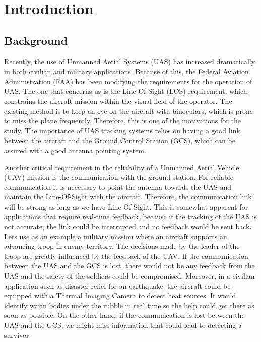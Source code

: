 \chapter{Introduction}
\label{ch:introduction}

\section{Background}
Recently, the use of Unmanned Aerial Systems (UAS) has increased dramatically in both civilian and military applications. Because of this, the Federal Aviation Administration (FAA) has been modifying the requirements for the operation of UAS. The one that concerns us is the Line-Of-Sight (LOS) requirement, which constrains the aircraft mission within the visual field of the operator. The existing method is to keep an eye on the aircraft with binoculars, which is prone to miss the plane frequently. Therefore, this is one of the motivations for the study. The importance of UAS tracking systems relies on having a good link between the aircraft and the Ground Control Station (GCS), which can be assured with a good antenna pointing system.

Another critical requirement in the reliability of a Unmanned Aerial Vehicle (UAV) mission is the communication with the ground station. For reliable communication it is necessary to point the antenna towards the UAS and maintain the Line-Of-Sight with the aircraft. Therefore, the communication link will be strong as long as we have Line-Of-Sight. This is somewhat apparent for applications that require real-time feedback, because if the tracking of the UAS is not accurate, the link could be interrupted and no feedback would be sent back. Lets use as an example a military mission where an aircraft supports an advancing troop in enemy territory.  The decisions made by the leader of the troop are greatly influenced by the feedback of the UAV. If the communication between the UAS and the GCS is lost, there would not be any feedback from the UAS and the safety of the soldiers could be compromised. Moreover, in a civilian application such as disaster relief for an earthquake, the aircraft could be equipped with a Thermal Imaging Camera to detect heat sources. It would identify warm bodies under the rubble in real time so the help could get there as soon as possible. On the other hand, if the communication is lost between the UAS and the GCS, we might miss information that could lead to detecting a survivor.

